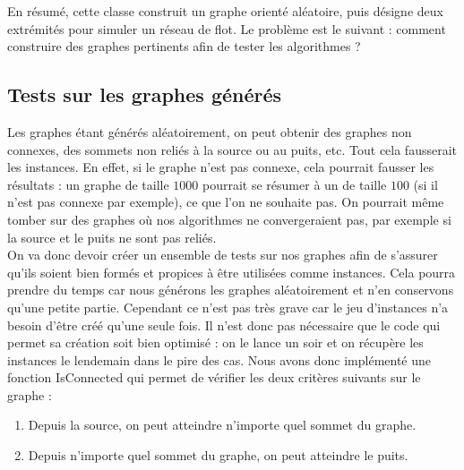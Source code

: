 \documentclass[a4paper]{article}
\begin{document}
En résumé, cette classe construit un graphe orienté aléatoire, puis désigne deux extrémités pour simuler un réseau de flot. Le problème est le suivant : comment construire des graphes pertinents afin de tester les algorithmes ? 

\subsection{Tests sur les graphes générés}
\label{sec:creer_instances}

Les graphes étant générés aléatoirement, on peut obtenir des graphes non connexes, des sommets non reliés à la source ou au puits, etc. Tout cela fausserait les instances. En effet, si le graphe n’est pas connexe, cela pourrait fausser les résultats : un graphe de taille $1000$ pourrait se résumer à un de taille $100$ (si il n'est pas connexe par exemple), ce que l’on ne souhaite pas. On pourrait même tomber sur des graphes où nos algorithmes ne convergeraient pas, par exemple si la source et le puits ne sont pas reliés.\\

On va donc devoir créer un ensemble de tests sur nos graphes afin de s’assurer qu’ils soient bien formés et propices à être utilisées comme instances. Cela pourra prendre du temps car nous générons les graphes aléatoirement et n’en conservons qu’une petite partie. Cependant ce n’est pas très grave car le jeu d’instances n’a besoin d’être créé qu’une seule fois. Il n’est donc pas nécessaire que le code qui permet sa création soit bien optimisé : on le lance un soir et on récupère les instances le lendemain dans le pire des cas.
Nous avons donc implémenté une fonction \textcolor{green!60!black}{IsConnected} qui permet de vérifier les deux critères suivants sur le graphe :
\begin{enumerate}
	\item Depuis la source, on peut atteindre n'importe quel sommet du graphe.
	\item Depuis n'importe quel sommet du graphe, on peut atteindre le puits.
\end{enumerate}
\end{document}
